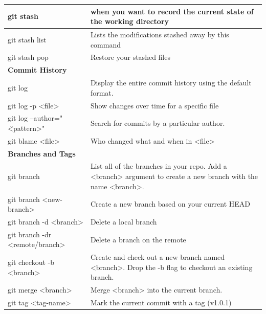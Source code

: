 \begin{longtable}{| p{} | p{} |}
    git stash&
    when you want to record the current state of the working directory 
    \\ \hline

    git stash list&
    Lists the modifications stashed away by this command
    \\ \hline
        
    git stash pop&
    Restore your stashed files
    \\ \hline \hline
        
    
	\textbf{Commit History}&  
	\\ \hline 
	
	\hline
	git log&
	Display the entire commit history using the default format.
	\\ \hline 
	
	git log -p <file>&
	Show changes over time for a specific file 
	\\ \hline
	
	git log --author="\"<pattern>"&
	Search for commits by a particular author. 
	\\ \hline
	
	git blame <file>& 
	Who changed what and when in <file>
	\\ \hline \hline
	
	\textbf{Branches and Tags}&  
	\\ \hline
	
	\hline
	git branch&
	List all of the branches in your repo. Add a <branch> argument to
	create a new branch with the name <branch>.
	\\ \hline 
	
	git branch <new-branch>&
	Create a new branch based
	on your current HEAD
	\\ \hline
	
	git branch -d <branch>&
	Delete a local branch
	\\ \hline   
	
	git branch -dr <remote/branch>&
	Delete a branch on the remote
	\\ \hline
	
	git checkout -b <branch>&
	Create and check out a new branch named <branch>. Drop the -b
	flag to checkout an existing branch.
	\\ \hline 
	
	git merge <branch>&
	Merge <branch> into the current branch.
	\\ \hline
	
	git tag <tag-name>&
	Mark the current commit with a tag (v1.0.1)
	\\ \hline  \hline
	

\end{longtable}
